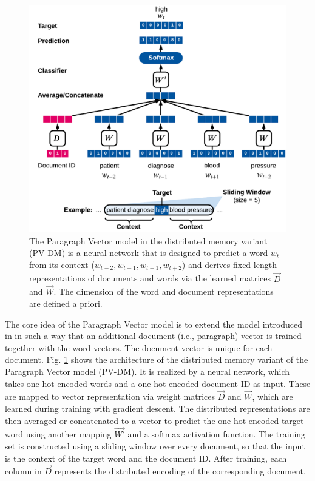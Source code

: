 \begin{figure}[!htbp]
	\centering
	\includegraphics[width=\textwidth]{figures/paragraph-vector}
	\caption[Paragraph Vector model]{The Paragraph Vector model in the distributed memory variant (PV-DM) is a neural network that is designed to predict a word $w_t$ from its context ($w_{t-2}, w_{t-1}, w_{t+1}, w_{t+2}$) and derives fixed-length representations of documents and words via the learned matrices $\vec{D}$ and $\vec{W}$. The dimension of the word and document representations are defined a priori.}
	\label{fig:paragraph-vector}
\end{figure}

The core idea of the Paragraph Vector model is to extend the model introduced in \cite{DBLP:journals/jmlr/BengioDVJ03} in such a way that an additional document (i.e., paragraph) vector is trained together with the word vectors.
The document vector is unique for each document.
Fig. \ref{fig:paragraph-vector} shows the architecture of the distributed memory variant of the Paragraph Vector model (PV-DM).
It is realized by a neural network, which takes one-hot encoded words and a one-hot encoded document ID as input.
These are mapped to vector representation via weight matrices $\vec{D}$ and $\vec{W}$, which are learned during training with gradient descent.
The distributed representations are then averaged or concatenated to a vector to predict the one-hot encoded target word using another mapping $\vec{W'}$ and a softmax activation function.
The training set is constructed using a sliding window over every document, so that the input is the context of the target word and the document ID.
After training, each column in $\vec{D}$ represents the distributed encoding of the corresponding document.

